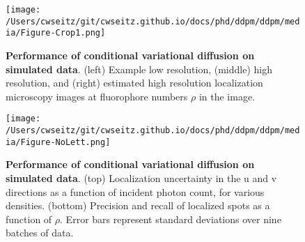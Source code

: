 

\begin{figure}[t]
\centering
\texttt{[image: /Users/cwseitz/git/cwseitz.github.io/docs/phd/ddpm/ddpm/media/Figure-Crop1.png]}
\caption{\textbf{Performance of conditional variational diffusion on simulated data}. (left) Example low resolution, (middle) high resolution, and (right) estimated high resolution localization microscopy images at fluorophore numbers $\rho$ in the image.}
\label{fig:cvdmsim1}
\end{figure}

\begin{figure}[t]
\centering
\texttt{[image: /Users/cwseitz/git/cwseitz.github.io/docs/phd/ddpm/ddpm/media/Figure-NoLett.png]}
\caption{\textbf{Performance of conditional variational diffusion on simulated data}. (top) Localization uncertainty in the u and v directions as a function of incident photon count, for various densities. (bottom) Precision and recall of localized spots as a function of $\rho$. Error bars represent standard deviations over nine batches of data. }
\label{fig:cvdmsim2}
\end{figure}



